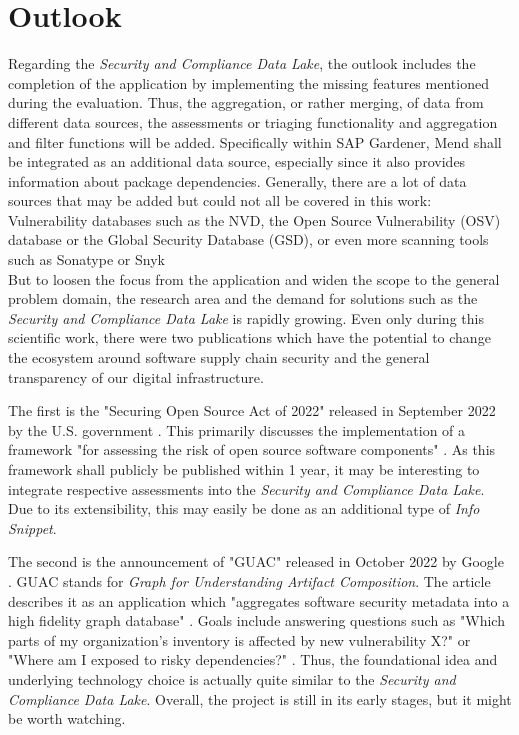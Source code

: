 \section{Outlook}
Regarding the \emph{Security and Compliance Data Lake}, the outlook includes the completion of the application by implementing the missing features mentioned during the evaluation. Thus, the aggregation, or rather merging, of data from different data sources, the assessments or triaging functionality and aggregation and filter functions will be added. Specifically within SAP Gardener, Mend shall be integrated as an additional data source, especially since it also provides information about package dependencies. Generally, there are a lot of data sources that may be added but could not all be covered in this work: Vulnerability databases such as the NVD, the Open Source Vulnerability (OSV) database or the Global Security Database (GSD), %
or even more scanning tools such as Sonatype or Snyk\\
 
But to loosen the focus from the application and widen the scope to the general problem domain, the research area and the demand for solutions such as the \emph{Security and Compliance Data Lake} is rapidly growing. Even only during this scientific work, there were two publications which have the potential to change the ecosystem around software supply chain security and the general transparency of our digital infrastructure.\par
The first is the "Securing Open Source Act of 2022" released in September 2022 by the U.S. government \cite{SecuringOpenSourceAct}. This primarily discusses the implementation of a framework "for assessing the risk of open source software components" \cite{SecuringOpenSourceAct}. As this framework shall publicly be published within 1 year, it may be interesting to integrate respective assessments into the \emph{Security and Compliance Data Lake}. Due to its extensibility, this may easily be done as an additional type of \emph{Info Snippet}.\par
The second is the announcement of "GUAC" released in October 2022 by Google \cite{GUAC}. GUAC stands for \emph{Graph for Understanding Artifact Composition}. The article describes it as an application which "aggregates software security metadata into a high fidelity graph database" \cite{GUAC}. Goals include answering questions such as "Which parts of my organization's inventory is affected by new vulnerability X?" or "Where am I exposed to risky dependencies?" \cite{GUAC}. Thus, the foundational idea and underlying technology choice is actually quite similar to the \emph{Security and Compliance Data Lake}. Overall, the project is still in its early stages, but it might be worth watching.\\

